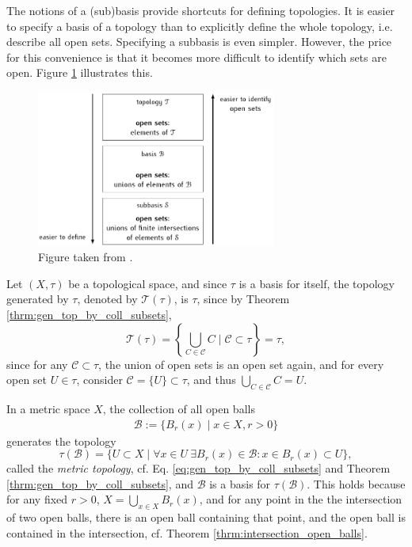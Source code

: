 \begin{remark}
	The notions of a (sub)basis provide shortcuts for defining topologies. It is easier to specify a basis of a topology than to explicitly define the whole topology, i.e. describe all open sets. Specifying a subbasis is even simpler. However, the price for this convenience is that it becomes more difficult to identify which sets are open. Figure \ref{fig:topology_sub_basis} illustrates this.
	\begin{figure}[h!]
		\centering 
		\includegraphics[width=0.7\textwidth]{Figures/topoly_(sub)basis.pdf}
		\caption{Figure taken from \cite{src:topology_sub_basis}.}
		\label{fig:topology_sub_basis}
	\end{figure}
\end{remark}

\begin{remark}\label{remark:topology_generated_by_topology}
	Let $(X, \tau)$ be a topological space, and since $\tau$ is a basis for itself, the topology generated by $\tau$, denoted by $\mathscr T(\tau)$, is $\tau$, since by Theorem \ref{thrm:gen_top_by_coll_subsets},
	$$\mathscr T(\tau) = \left\{ \bigcup_{C\in\mathscr C}C \mid \mathscr C \subset \tau \right\} = \tau,$$ since for any $\mathscr C\subset\tau$, the union of open sets is an open set again, and for every open set $U\in\tau$, consider $\mathscr C = \{U\}\subset \tau$, and thus $\bigcup_{C\in\mathscr C}C = U$.
\end{remark}

\begin{exmp}\label{exmp:metric_topology}
	In a metric space $X$, the collection of all open balls 
	\begin{align}\label{eq:bases_open_ball_metric_spaces}
		\mathscr B := \{ B_{r}(x) \mid x\in X, r > 0 \}
	\end{align} 
	generates the topology $$\tau(\mathscr B) = \{U\subset X\mid \forall x\in U\ \exists B_{r}(x)\in\mathscr B: x\in B_{r}(x)\subset U\},$$
	called the \textit{metric topology}, cf. Eq. \eqref{eq:gen_top_by_coll_subsets} and Theorem \ref{thrm:gen_top_by_coll_subsets}, and $\mathscr B$ is a basis for $\tau(\mathscr B)$. This holds because for any fixed $r > 0$, $X = \bigcup_{x\in X}B_{r}(x)$, and for any point in the the intersection of two open balls, there is an open ball containing that point, and the open ball is contained in the intersection, cf. Theorem \ref{thrm:intersection_open_balls}.
\end{exmp}

